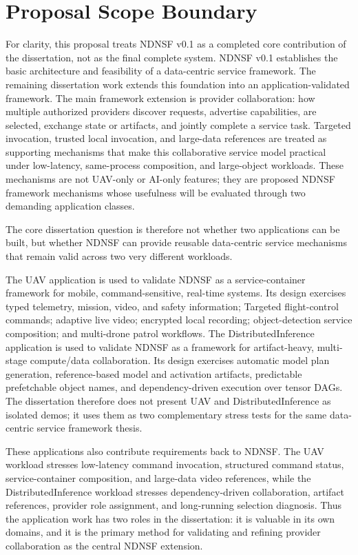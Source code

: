 \section{Proposal Scope Boundary}

For clarity, this proposal treats NDNSF v0.1 as a completed core contribution
of the dissertation, not as the final complete system. NDNSF v0.1 establishes
the basic architecture and feasibility of a data-centric service framework. The
remaining dissertation work extends this foundation into an
application-validated framework. The main framework extension is provider
collaboration: how multiple authorized providers discover requests, advertise
capabilities, are selected, exchange state or artifacts, and jointly complete a
service task. Targeted invocation, trusted local invocation, and large-data
references are treated as supporting mechanisms that make this collaborative
service model practical under low-latency, same-process composition, and
large-object workloads. These mechanisms are not UAV-only or AI-only features;
they are proposed NDNSF framework mechanisms whose usefulness will be evaluated
through two demanding application classes.

The core dissertation question is therefore not whether two applications can
be built, but whether NDNSF can provide reusable data-centric service
mechanisms that remain valid across two very different workloads.

The UAV application is used to validate NDNSF as a service-container framework
for mobile, command-sensitive, real-time systems. Its design exercises typed
telemetry, mission, video, and safety information; Targeted flight-control
commands; adaptive live video; encrypted local recording; object-detection
service composition; and multi-drone patrol workflows. The DistributedInference
application is used to validate NDNSF as a framework for artifact-heavy,
multi-stage compute/data collaboration. Its design exercises automatic model
plan generation, reference-based model and activation artifacts, predictable
prefetchable object names, and dependency-driven execution over tensor DAGs.
The dissertation therefore does not present UAV and DistributedInference as
isolated demos; it uses them as two complementary stress tests for the same
data-centric service framework thesis.

These applications also contribute requirements back to NDNSF. The UAV
workload stresses low-latency command invocation, structured command status,
service-container composition, and large-data video references, while the
DistributedInference workload stresses dependency-driven collaboration,
artifact references, provider role assignment, and long-running selection
diagnosis. Thus the application work has two roles in the dissertation: it is
valuable in its own domains, and it is the primary method for validating and
refining provider collaboration as the central NDNSF extension.
